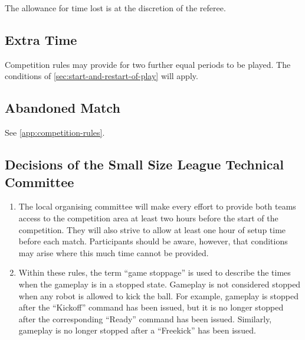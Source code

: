 The allowance for time lost is at the discretion of the referee.

\subsection{Extra Time}
Competition rules may provide for two further equal periods to be played.
The conditions of \autoref{sec:start-and-restart-of-play} will apply.

\subsection{Abandoned Match}
See \autoref{app:competition-rules}.

\subsection*{Decisions of the Small Size League Technical Committee}
\begin{enumerate}
\item
The local organising committee will make every effort to provide both teams access to the competition area at least two hours before the start of the competition.
They will also strive to allow at least one hour of setup time before each match.
Participants should be aware, however, that conditions may arise where this much time cannot be provided.

\item
Within these rules, the term ``game stoppage'' is used to describe the times when the gameplay is in a stopped state.
Gameplay is not considered stopped when any robot is allowed to kick the ball.
For example, gameplay is stopped after the ``Kickoff'' command has been issued, but it is no longer stopped after the corresponding ``Ready'' command has been issued.
Similarly, gameplay is no longer stopped after a ``Freekick'' has been issued.
\end{enumerate}